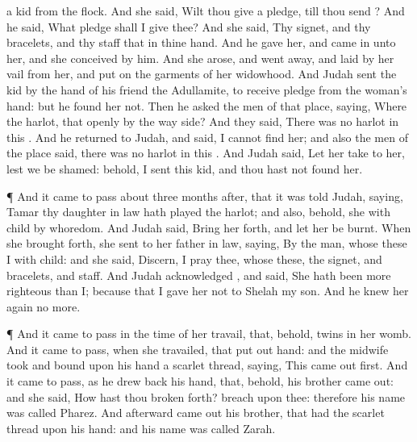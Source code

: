 {{} a
kid from the
flock. And she
said, Wilt thou
give
{} a
pledge, till thou
send
{}?
And he
said,
What
pledge shall I
give thee? And she
said, Thy
signet, and thy
bracelets, and thy
staff that
{} in thine
hand. And he
gave
{} her, and came
in unto her, and she
conceived by him.
And she
arose, and went
away, and laid
by her
vail from her, and put
on the
garments of her
widowhood.
And
Judah
sent the
kid by the
hand of his
friend the
Adullamite, to
receive
{}
pledge from the
woman’s
hand: but he found
her not.
Then he
asked the
men of that
place,
saying, Where
{} the
harlot, that
{}
openly by the way
side? And they
said, There was no
harlot in
this
{}.
And he
returned to
Judah, and
said, I
cannot
find her; and also the
men of the
place
said,
{} there was no
harlot in this
{}.
And
Judah
said, Let her
take
{} to her, lest we be
shamed: behold, I
sent this
kid, and thou hast not
found her.
\par }{\PP {}¶ And it came to pass about
three
months after, that it was
told
Judah,
saying,
Tamar thy daughter in
law hath played the
harlot; and also, behold, she
{} with
child by
whoredom. And
Judah
said, Bring her
forth, and let her be
burnt.
When she
{} brought
forth, she
sent to her father in
law,
saying, By the
man, whose these
{} I with
child: and she
said,
Discern, I pray thee, whose
{} these, the
signet, and
bracelets, and
staff.
And
Judah
acknowledged
{}, and
said, She hath been more
righteous than I; because that I
gave her not to
Shelah my
son. And he knew
her
again no more.
\par }{\PP {}¶ And it came to pass in the
time of her
travail, that, behold,
twins
{} in her
womb.
And it came to pass, when she
travailed, that
{} put
out
{}
hand: and the
midwife
took and
bound upon his
hand a scarlet
thread,
saying, This came
out
first.
And it came to pass, as he drew
back his
hand, that, behold, his
brother came
out: and she
said, How hast thou broken
forth?
{}
breach
{} upon thee: therefore his
name was
called
Pharez.
And
afterward came
out his
brother, that had the scarlet
thread upon his
hand: and his
name was
called
Zarah.

}
